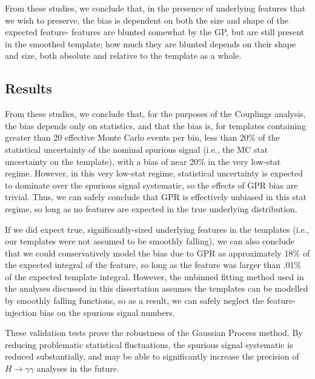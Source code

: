 From these studies, we conclude that, in the presence of underlying features that we wish to preserve, the bias is dependent on both the size and shape of the expected feature- features are blunted somewhat by the GP, but are still present in the smoothed template; how much they are blunted depends on their shape and size, both absolute and relative to the template as a whole.


\subsection{Results}
From these studies, we conclude that, for the purposes of the Couplings analysis, the bias depends only on statistics, and that the bias is, for templates containing greater than 20 effective Monte Carlo events per bin, less than 20\% of the statistical uncertainty of the nominal spurious signal (i.e., the MC stat uncertainty on the template), with a bias of near 20\% in the very low-stat regime. However, in this very low-stat regime, statistical uncertainty is expected to dominate over the spurious signal systematic, so the effects of GPR bias are trivial. Thus, we can safely conclude that GPR is effectively unbiased in this stat regime, so long as no features are expected in the true underlying distribution. 

If we did expect true, significantly-sized underlying features in the templates (i.e., our templates were not assumed to be smoothly falling), we can also conclude that we could conservatively model the bias due to GPR as approximately 18\% of the expected integral of the feature, so long as the feature was larger than .01\% of the expected template integral. However, the unbinned fitting method used in the analyses discussed in this dissertation assumes the templates can be modelled by smoothly falling functions, so as a result, we can safely neglect the feature-injection bias on the spurious signal numbers.

These validation tests prove the robustness of the Gaussian Process method. By reducing problematic statistical fluctuations, the spurious signal systematic is reduced substantially, and may be able to significantly increase the precision of $H \rightarrow \gamma \gamma$ analyses in the future. 

